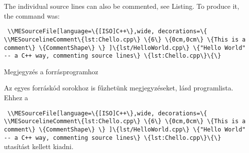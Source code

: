 {
The individual source lines can also be commented, see Listing\ao{ \ref{lst:Chello.cpp}}.
To produce it, the command was:
\par\noindent\lstinline|
\\MESourceFile[language=\{[ISO]C++\},wide,
decorations=\{
\\MESourcelineComment\{lst:Chello.cpp\} \{6\} \{0cm,0cm\} \{This is a comment\} \{CommentShape\}
\}
]\{lst/HelloWorld.cpp\} \{"Hello World" -- a C++ way, commenting source lines\} \{lst:Chello.cpp\}\{\}
|

}
{Megjegyzés a forrásprogramhoz}
{
Az egyes forráskód sorokhoz is fűzhetünk megjegyzéseket, lásd\ao{  \ref{lst:Chello.cpp}} programlista.
Ehhez a
\par\noindent\lstinline|
\\MESourceFile[language=\{[ISO]C++\},wide,
decorations=\{
\\MESourcelineComment\{lst:Chello.cpp\} \{6\} \{0cm,0cm\} \{This is a comment\} \{CommentShape\}
\}
]\{lst/HelloWorld.cpp\} \{"Hello World" -- a C++ way, commenting source lines\} \{lst:Chello.cpp\}\{\}
|
utasítást kellett kiadni.

}


